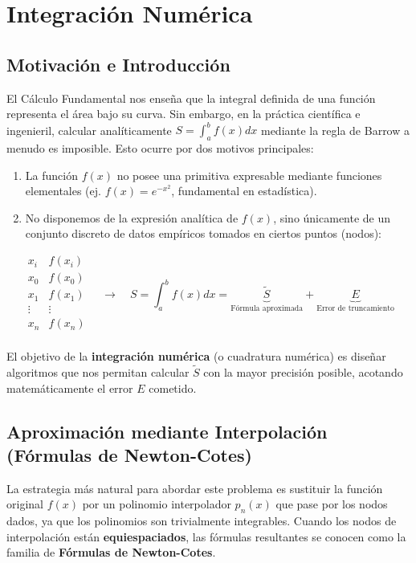 \section{Integración Numérica}

\subsection{Motivación e Introducción}

El Cálculo Fundamental nos enseña que la integral definida de una función representa el área bajo su curva. Sin embargo, en la práctica científica e ingenieril, calcular analíticamente $S = \int_a^b f(x) dx$ mediante la regla de Barrow a menudo es imposible. Esto ocurre por dos motivos principales:
\begin{enumerate}
    \item La función $f(x)$ no posee una primitiva expresable mediante funciones elementales (ej. $f(x) = e^{-x^2}$, fundamental en estadística).
    \item No disponemos de la expresión analítica de $f(x)$, sino únicamente de un conjunto discreto de datos empíricos tomados en ciertos puntos (nodos):
\end{enumerate}
\[
    \begin{array}{c|c}
        x_i & f(x_i) \\
        \hline
        x_0 & f(x_0) \\
        x_1 & f(x_1) \\
        \vdots & \vdots \\
        x_n & f(x_n) \\
    \end{array}
    \quad \longrightarrow \quad
    S = \int_a^b f(x) dx = \underbrace{\widetilde{S}}_{\text{Fórmula aproximada}} + \underbrace{E}_{\text{Error de truncamiento}}
\]

El objetivo de la \textbf{integración numérica} (o cuadratura numérica) es diseñar algoritmos que nos permitan calcular $\widetilde{S}$ con la mayor precisión posible, acotando matemáticamente el error $E$ cometido.

\subsection{Aproximación mediante Interpolación (Fórmulas de Newton-Cotes)}

La estrategia más natural para abordar este problema es sustituir la función original $f(x)$ por un polinomio interpolador $p_n(x)$ que pase por los nodos dados, ya que los polinomios son trivialmente integrables. Cuando los nodos de interpolación están \textbf{equiespaciados}, las fórmulas resultantes se conocen como la familia de \textbf{Fórmulas de Newton-Cotes}.

